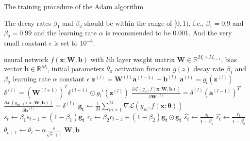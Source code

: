 \documentclass[
	parskip, 			   %
	twoside, 			   %
	DIV=14, 			   %
	BCOR=15.0mm, 		   %
	headsepline, 		   %
	open=right, 		   %
	captions=tableheading, %
	bibliography=totoc,    %
	numbers=noenddot       %
]{scrreprt}
\begin{document}
\clearpage
\begin{algorithm}[h!]
\caption{The training procedure of the Adam algorithm}
The decay rates $\beta_1$ and $\beta_2$ should be within the range of $[0,1)$, f.e., $\beta_1=0.9$ and $\beta_2=0.99$ and the learning rate $\alpha$ is recommended to be 0.001. And the very small constant $\epsilon$ is set to $10^{-8}$.
\label{alg:Adam_alg}
    \begin{algorithmic}[1]
    \Require neural network $f(\mathbf{x};\mathbf{W},\mathbf{b})$ with $l$th layer
    \Require weight matrix $\mathbf{W} \in \mathbb{R}^{M_{l} \times M_{l-1}}$, bias vector $\mathbf{b} \in \mathbb{R}^{M_{l}}$, initial parameters $\theta_{0}$
    \Require activation function $g(z)$
    \Require decay rate $\beta_1$ and $\beta_2$
    \Require learning rate $\alpha$
    \Require constant $\epsilon$
     
            \State $\mathbf{z}^{(l)} = \mathbf{W}^{(l)} \mathbf{a}^{(l-1)} + \mathbf{b}^{(l)}$ 
            \State $\mathbf{a}^{(l)} = g_{l}(\mathbf{z}^{(l)})$ 
            \State {}
            \State $\delta^{(l)} = (\mathbf{W}^{(l+1)})^T \delta^{(l+1)} \odot g_{l}'(\mathbf{z}^{(l)})$ 
            \State {}
            \State $\frac{\partial \mathcal{L}\left( y_m,f(\mathbf{x};\mathbf{\mathbf{W},\mathbf{b}}) \right)}{\partial \mathbf{W}^{(l)}} = \delta^{(l)} (\mathbf{a}^{(l-1)})^T$ 
            \State $\frac{\partial \mathcal{L}\left( y_m,f(\mathbf{x};\mathbf{\mathbf{W},\mathbf{b}}) \right)}{\partial \mathbf{b}^{(l)}} = \delta^{(l)}$ 
            \State {}
        \EndFor
    \EndFor
    \State $\mathbf{g_t} \gets \frac{1}{M} \sum\nolimits_{m=1}^M \nabla \mathcal{L}\left( y_{m},f(\mathbf{x};\mathbf{\theta}) \right)$ 
    \State $s_t \gets \beta_1 s_{t-1} + (1-\beta_1) \mathbf{g_t}$ 
    \State $r_t \gets \beta_2 r_{t-1} + (1-\beta_2) \mathbf{g_t} \odot \mathbf{g_t}$ 
    \State {}
    \State $\hat{s_t} \gets \frac{s_t}{1-\beta_1^t}$ 
    \State $\hat{r_t} \gets \frac{r_t}{1-\beta_2^t}$ 
    \State {}
    \State $\theta_{t+1} \gets \theta_{t} - \alpha \frac{\hat{s}}{\sqrt{\hat{r}} + \epsilon}$ 
    \State {}
    \State \Return $\mathbf{W}, \mathbf{b}$ 
    \end{algorithmic}
\end{algorithm}
\end{document}

